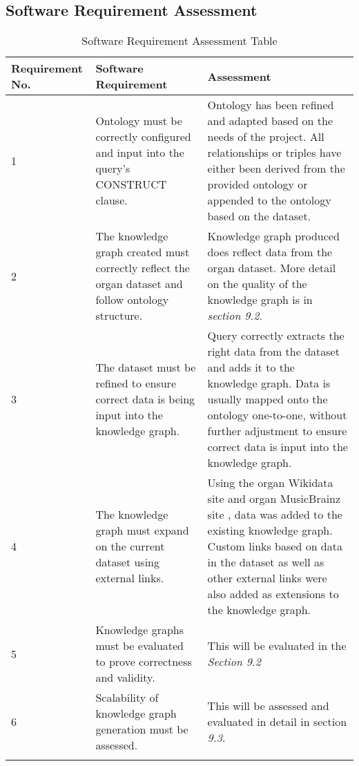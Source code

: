 \subsection{Software Requirement Assessment}
\begin{longtable}{|p{2.25cm}|p{5.5cm}|p{5.5cm}|}

\hline
\textbf{Requirement No.} & \textbf{Software Requirement} & \textbf{Assessment}\\
\hline

1& 
Ontology must be correctly configured and input into the query's CONSTRUCT clause. &
Ontology has been refined and adapted based on the needs of the project. All relationships or triples have either been derived from the provided ontology or appended to the ontology based on the dataset. \\
\hline

2&
The knowledge graph created must correctly reflect the organ dataset and follow ontology structure. &
Knowledge graph produced does reflect data from the organ dataset. More detail on the quality of the knowledge graph is in \textit{section 9.2}. \\
\hline

3&
The dataset must be refined to ensure correct data is being input into the knowledge graph. &
Query correctly extracts the right data from the dataset and adds it to the knowledge graph. Data is usually mapped onto the ontology one-to-one, without further adjustment to ensure correct data is input into the knowledge graph. \\
\hline

4&
The knowledge graph must expand on the current dataset using external links. &
Using the organ Wikidata site \cite{organwikidata} and organ MusicBrainz site \cite{organmusicbrainz}, data was added to the existing knowledge graph. Custom links based on data in the dataset as well as other external links were also added as extensions to the knowledge graph. \\
\hline

5&
Knowledge graphs must be evaluated to prove correctness and validity. &
This will be evaluated in the \textit{Section 9.2} \\ 
\hline

6&
Scalability of knowledge graph generation must be assessed. &
This will be assessed and evaluated in detail in section \textit{9.3}. \\ 
\hline
\caption{Software Requirement Assessment Table}
\end{longtable}

